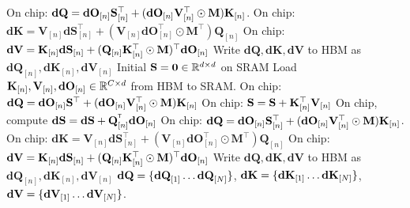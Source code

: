 \begin{algorithm}[hb]
\begin{algorithmic}
   \State On chip:  $\mathbf{dQ} = \mathbf{dO}_{[n]} {\mathbf{S}}_{[n]}^{\top}  + (\mathbf{dO}_{[n]} {\mathbf{V}}_{[n]}^{\top} \odot \mathbf{M}) \mathbf{K}_{[n]}$.
   \State On chip:   $\mathbf{dK} =  \mathbf{V}_{[n]} \mathbf{dS}_{[n]}^{\top} +  (\mathbf{V}_{[n]}\mathbf{dO}_{[n]}^{\top} \odot \mathbf{M}^{\top}) \mathbf{Q}_{[n]}$
   \State On chip: $\mathbf{dV} =  \mathbf{K}_{[n]} \mathbf{dS}_{[n]} + ({\mathbf{Q}}_{[n]}{\mathbf{K}}_{[n]}^{\top} \odot \mathbf{M})^{\top} \mathbf{dO}_{[n]}$
    \State Write $ \mathbf {dQ}, \mathbf{dK}, \mathbf{dV}$ to HBM as $\mathbf{dQ}_{[n]}, \mathbf{dK}_{[n]}, \mathbf{dV}_{[n]}$
      \EndParFor
      \color{black}
\Else  {}
\State Initial ${\mathbf{S}} = \bm{0} \in \mathbb R^{d\times d} $ on SRAM
    
\State Load ${\mathbf{K}}_{[n]}, {\mathbf{V}}_{[n]}, {\mathbf{dO}}_{[n]}   \in \mathbb{R}^{C \times d}$ from HBM to SRAM.
%
\State On chip: ${\mathbf{dQ}} = \mathbf{dO}_{[n]} {\mathbf{S}}^{\top}  + (\mathbf{dO}_{[n]} {\mathbf{V}}_{[n]}^{\top} \odot \mathbf{M}) \mathbf{K}_{[n]}$ 
\State On chip: ${\mathbf{S}} = {\mathbf{S}} + {\mathbf{K}}_{[n]}^{\top}{\mathbf{V}}_{[n]}$
\EndFor
\color{black}
       
    \color{black}
        \State On chip, compute $\rmdS = \rmdS + \rmQ_{[n]}^\intercal \rmdO_{[n]}$
       \State On chip:  $\mathbf{dQ} = \mathbf{dO}_{[n]} {\mathbf{S}}_{[n]}^{\top}  + (\mathbf{dO}_{[n]} {\mathbf{V}}_{[n]}^{\top} \odot \mathbf{M}) \mathbf{K}_{[n]}$.
       \State On chip:   $\mathbf{dK} = \mathbf{V}_{[n]}\mathbf{dS}_{[n]}^{\top}  +  (\mathbf{V}_{[n]}\mathbf{dO}_{[n]}^{\top} \odot \mathbf{M}^{\top}) \mathbf{Q}_{[n]}$
       \State On chip: $\mathbf{dV} =  \mathbf{K}_{[n]} \mathbf{dS}_{[n]} + ({\mathbf{Q}}_{[n]}{\mathbf{K}}_{[n]}^{\top} \odot \mathbf{M})^{\top} \mathbf{dO}_{[n]}$
           \State Write $ \mathbf {dQ}, \mathbf{dK}, \mathbf{dV}$ to HBM as $\mathbf{dQ}_{[n]}, \mathbf{dK}_{[n]}, \mathbf{dV}_{[n]}$
            \color{black}
      \EndFor
\EndIf 
  \State \Return ${\mathbf{dQ}} = \{ {\mathbf{dQ}}_{[1]} \dots {\mathbf{dQ}}_{[N]} \}$, ${\mathbf{dK}}=\{ {\mathbf{dK}}_{[1]} \dots {\mathbf{dK}}_{[N]} \}$, ${\mathbf{dV}}=\{ {\mathbf{dV}}_{[1]} \dots {\mathbf{dV}}_{[N]} \}$.
\end{algorithmic}
\end{algorithm}
